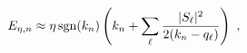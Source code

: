 \begin{equation}
E_{\eta,n} \approx \eta \, {\rm sgn}(k_n) \left( k_n + \sum_{\ell} \frac{|S_{\ell}|^2}{2(k_n-q_{\ell})} \right) \ ,
\label{d7}
\end{equation}

